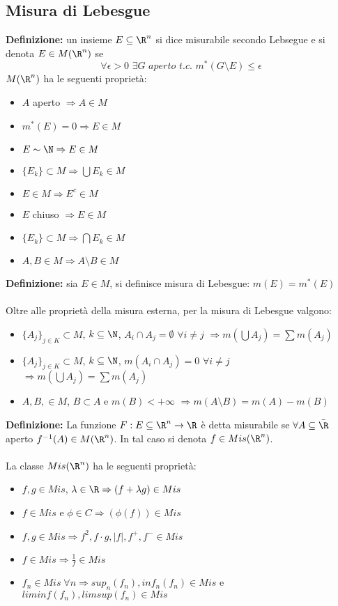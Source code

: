 \documentclass{article}
\begin{document}
\subsection{Misura di Lebesgue}
\textbf{Definizione:} un insieme $E\subseteq\R^n$ si dice misurabile secondo Lebsegue e si denota $E\in M(\R^n)$ se
$$ \forall\epsilon>0\,\,\exists G\,\,aperto\,\,t.c.\,\,m^*(G\setminus E)\leq\epsilon $$
$M(\R^n)$ ha le seguenti proprietà:
\begin{itemize}
    \item $A$ aperto $\Rightarrow A\in M$
    \item $m^*(E)=0\Rightarrow E\in M$
    \item $E\sim\N\Rightarrow E\in M$
    \item $\{E_k\}\subset M\Rightarrow\bigcup E_k\in M$
    \item $E\in M\Rightarrow E^c\in M$
    \item $E$ chiuso $\Rightarrow E\in M$
    \item $\{E_k\}\subset M\Rightarrow\bigcap E_k\in M$
    \item $A,B\in M\Rightarrow A\setminus B\in M$
\end{itemize}
\textbf{Definizione:} sia $E\in M$, si definisce misura di Lebesgue: $ m(E)=m^*(E) $\\\\
Oltre alle proprietà della misura esterna, per la misura di Lebesgue valgono:
\begin{itemize}
    \item $\{A_j\}_{j\in K}\subset M$, $k\subseteq\N$, $A_i\cap A_j=\emptyset$ $\forall i\neq j$ $\Rightarrow m(\bigcup A_j)=\sum m(A_j)$
    \item $\{A_j\}_{j\in K}\subset M$, $k\subseteq\N$, $m(A_i\cap A_j)=0$ $\forall i\neq j$ $\Rightarrow m(\bigcup A_j)=\sum m(A_j)$
    \item $A,B,\in M$, $B\subset A$ e $m(B)<+\infty$ $\Rightarrow m(A\setminus B)=m(A)-m(B)$
\end{itemize}
\textbf{Definizione:} La funzione $F:E\subseteq\R^n\rightarrow\R$ è detta misurabile se $\forall A\subseteq\bar{\R}$ aperto $f^{-1}(A)\in M(\R^n)$. In tal caso si denota $f\in Mis(\R^n)$.\\\\
La classe $Mis(\R^n)$ ha le seguenti proprietà:
\begin{itemize}
    \item $f,g\in Mis$, $\lambda\in\R\Rightarrow (f+\lambda g)\in Mis$
    \item $f\in Mis$ e $\phi\in C\Rightarrow(\phi(f))\in Mis$
    \item $f,g\in Mis\Rightarrow f^2,f\cdot g,|f|,f^+,f^-\in Mis$
    \item $f\in Mis\Rightarrow\frac{1}{f}\in Mis$
    \item $f_n\in Mis\;\forall n\Rightarrow sup_n(f_n),inf_n(f_n)\in Mis$ e $liminf(f_n), limsup(f_n)\in Mis$
\end{itemize}
\end{document}
